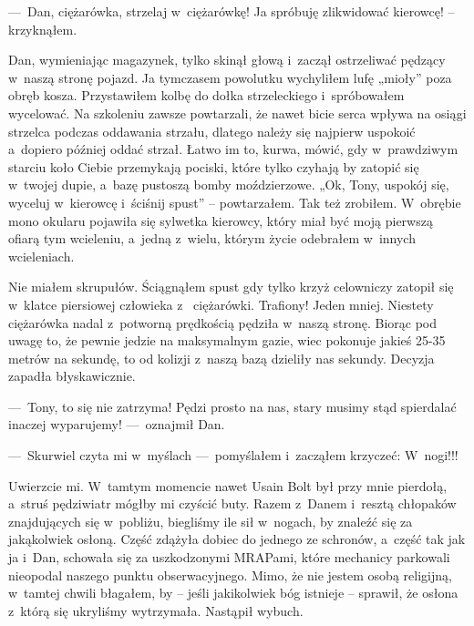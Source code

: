 ---~Dan, ciężarówka, strzelaj w~ciężarówkę! Ja spróbuję zlikwidować kierowcę! – krzyknąłem.

Dan, wymieniając magazynek, tylko skinął głową i~zaczął ostrzeliwać pędzący w~naszą stronę pojazd. Ja tymczasem 
powolutku wychyliłem lufę „mioły” poza obręb kosza. Przystawiłem kolbę do dołka strzeleckiego i~spróbowałem 
wycelować. Na szkoleniu zawsze powtarzali, że nawet bicie serca wpływa na osiągi strzelca podczas oddawania strzału, 
dlatego należy się najpierw uspokoić a~dopiero później oddać strzał. Łatwo im to, kurwa, mówić, gdy w~prawdziwym 
starciu koło Ciebie przemykają pociski, które tylko czyhają by zatopić się w~twojej dupie, a~bazę pustoszą bomby 
moździerzowe. „Ok, Tony, uspokój się, wyceluj w~kierowcę i~ściśnij spust” -- powtarzałem. Tak też zrobiłem. W~obrębie 
mono okularu pojawiła się sylwetka kierowcy, który miał być moją pierwszą ofiarą tym wcieleniu, a~jedną z~wielu, 
którym życie odebrałem w~innych wcieleniach.

Nie miałem skrupułów. Ściągnąłem spust gdy tylko krzyż celowniczy zatopił się w~klatce piersiowej człowieka z~
ciężarówki. Trafiony! Jeden mniej. Niestety ciężarówka nadal z~potworną prędkością pędziła w~naszą stronę. Biorąc pod 
uwagę to, że pewnie jedzie na maksymalnym gazie, wiec pokonuje jakieś 25-35 metrów na sekundę, to od kolizji z~naszą 
bazą dzieliły nas sekundy. Decyzja zapadła błyskawicznie.

---~Tony, to się nie zatrzyma! Pędzi prosto na nas, stary musimy stąd spierdalać inaczej wyparujemy! ---~oznajmił Dan.

---~Skurwiel czyta mi w~myślach ---~pomyślałem i~zacząłem krzyczeć: W~nogi!!! 

Uwierzcie mi. W~tamtym momencie nawet Usain Bolt był przy mnie pierdołą, a~struś pędziwiatr mógłby mi czyścić buty. 
Razem z~Danem i~resztą chłopaków znajdujących się w~pobliżu, biegliśmy ile sił w~nogach, by znaleźć się za 
jakąkolwiek osłoną. Część zdążyła dobiec do jednego ze schronów, a~część tak jak ja i~Dan, schowała się za 
uszkodzonymi MRAPami, które mechanicy parkowali nieopodal naszego punktu obserwacyjnego. Mimo, że nie jestem osobą 
religijną, w~tamtej chwili błagałem, by -- jeśli jakikolwiek bóg istnieje -- sprawił, że osłona z~którą się ukryliśmy 
wytrzymała. Nastąpił wybuch.
